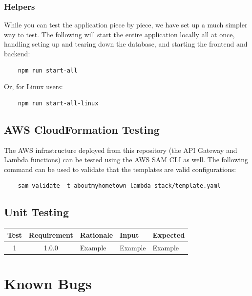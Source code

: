 \documentclass[12pt]{article}
\begin{document}
\subsubsection{Helpers}

While you can test the application piece by piece, we have set up a much simpler way to test. The following will start the entire application locally all at once, handling seting up and tearing down the database, and starting the frontend and backend:

\begin{verbatim}
    npm run start-all
\end{verbatim}

Or, for Linux users:

\begin{verbatim}
    npm run start-all-linux
\end{verbatim}

\subsection{AWS CloudFormation Testing}

The AWS infrastructure deployed from this repository (the API Gateway and Lambda functions) can be tested using the AWS SAM CLI as well. The following command can be used to validate that the templates are valid configurations:

\begin{verbatim}
    sam validate -t aboutmyhometown-lambda-stack/template.yaml
\end{verbatim}

\subsection{Unit Testing}

\setlength{\tabcolsep}{3mm}
\begin{tabular}{|c|c|l|l|l|}
    \hline
    Test & Requirement & Rationale & Input   & Expected \\

    \hline
    1    & 1.0.0       & Example   & Example & Example  \\
    \hline
\end{tabular}



\newpage

\section{Known Bugs}
\end{document}
